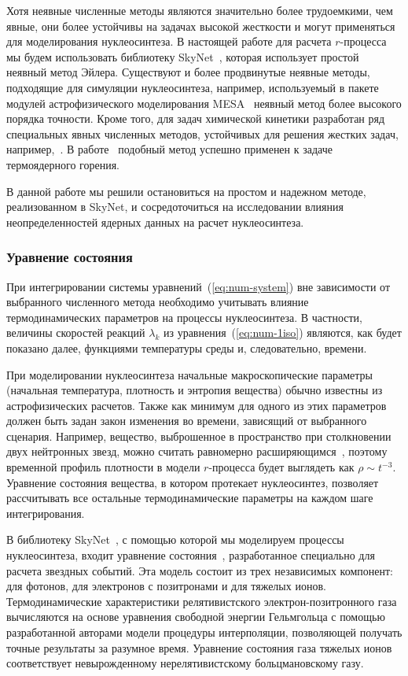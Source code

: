 Хотя неявные численные методы являются значительно более трудоемкими, чем явные, они более устойчивы на задачах высокой жесткости и могут применяться для моделирования нуклеосинтеза. В настоящей работе для расчета $r$-процесса мы будем использовать библиотеку SkyNet~\cite{lippuner2017}, которая использует простой неявный метод Эйлера. Существуют и более продвинутые неявные методы, подходящие для симуляции нуклеосинтеза, например, используемый в пакете модулей астрофизического моделирования MESA~\cite{paxton2011} неявный метод более высокого порядка точности. Кроме того, для задач химической кинетики разработан ряд специальных явных численных методов, устойчивых для решения жестких задач, например,~\cite{bulatov2018}. В работе~\cite{guidry2013} подобный метод успешно применен к задаче термоядерного горения.

В данной работе мы решили остановиться на простом и надежном методе, реализованном в SkyNet, и сосредоточиться на исследовании влияния неопределенностей ядерных данных на расчет нуклеосинтеза.

\subsubsection{Уравнение состояния}
\label{sec:eos}
При интегрировании системы уравнений~(\ref{eq:num-system}) вне зависимости от выбранного численного метода необходимо учитывать влияние термодинамических параметров на процессы нуклеосинтеза. В частности, величины скоростей реакций $\lambda_k$ из уравнения~(\ref{eq:num-1iso}) являются, как будет показано далее, функциями температуры среды и, следовательно, времени. 

При моделировании нуклеосинтеза начальные макроскопические параметры (начальная температура, плотность и энтропия вещества) обычно известны из астрофизических расчетов. Также как минимум для одного из этих параметров должен быть задан закон изменения во времени, зависящий от выбранного сценария. Например, вещество, выброшенное в пространство при столкновении двух нейтронных звезд, можно считать равномерно расширяющимся~\cite{korobkin2012}, поэтому временной профиль плотности в модели $r$-процесса будет выглядеть как $\rho \sim t^{-3}$. Уравнение состояния вещества, в котором протекает нуклеосинтез, позволяет рассчитывать все остальные термодинамические параметры на каждом шаге интегрирования.

В библиотеку SkyNet~\cite{lippuner2017}, с помощью которой мы моделируем процессы нуклеосинтеза, входит уравнение состояния~\cite{timmes1999,timmes2000}, разработанное специально для расчета звездных событий. Эта модель состоит из трех независимых компонент: для фотонов, для электронов с позитронами и для тяжелых ионов. Термодинамические характеристики релятивистского электрон-позитронного газа вычисляются на основе уравнения свободной энергии Гельмгольца с помощью разработанной авторами модели процедуры интерполяции, позволяющей получать точные результаты за разумное время. Уравнение состояния газа тяжелых ионов соответствует невырожденному нерелятивистскому больцмановскому газу.

